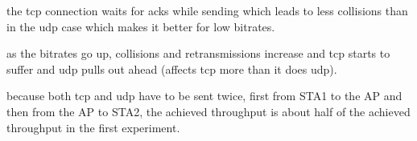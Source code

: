 the tcp connection waits for acks while sending which leads to less collisions than in the udp case which makes it better for low bitrates.

as the bitrates go up, collisions and retransmissions increase and tcp starts to suffer and udp pulls out ahead (affects tcp more than it does udp).

because both tcp and udp have to be sent twice, first from STA1 to the AP and then from the AP to STA2, the achieved throughput is about half of the achieved throughput in the first experiment.


